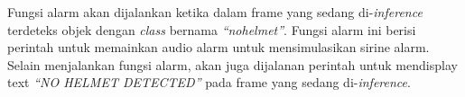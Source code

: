 

Fungsi alarm akan dijalankan ketika dalam frame yang sedang di-\emph{inference} terdeteks objek dengan \emph{class} bernama \emph{“no\textunderscore helmet”}. Fungsi alarm ini berisi perintah untuk memainkan audio alarm untuk mensimulasikan sirine alarm. Selain menjalankan fungsi alarm, akan juga dijalanan perintah untuk mendisplay text \emph{“NO HELMET DETECTED”} pada frame yang sedang di-\emph{inference}.

